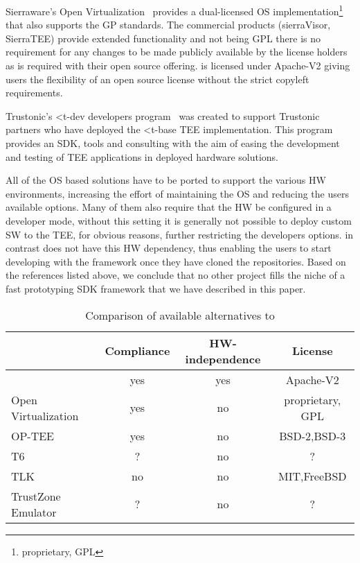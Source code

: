 \documentclass[10pt,conference,letterpaper]{IEEEtran}
\newcommand{\opentee}{\protect{TEE-Vi}\xspace}
\newcommand{\opentee}{\protect{Open-TEE}\xspace}
\begin{document}
Sierraware's Open Virtualization~\cite{web:openVirtua} provides a dual-licensed OS implementation\footnote{proprietary, GPL} that also supports the GP standards. The commercial products (sierraVisor, SierraTEE) provide extended functionality and not being GPL there is no requirement for any changes to be made  publicly available by the license holders as is required with their open source offering. \opentee is licensed under Apache-V2 giving users the flexibility of an open source license without the strict copyleft requirements.

Trustonic's <t-dev developers program~\cite{web:trustonic_t_dev} was created to support Trustonic partners who have deployed the <t-base TEE implementation. This program provides an SDK, tools and consulting with the aim of easing the development and testing of TEE applications in deployed hardware solutions.

All of the OS based solutions have to be ported to support the various HW environments, increasing the effort of maintaining the OS and reducing the users available options.  Many of them also require that the HW be configured in a developer mode, without this setting it is generally not possible to deploy custom SW to the TEE, for obvious reasons, further restricting the developers options.  \opentee in contrast does not have this HW dependency, thus enabling the users to start developing with the framework once they have cloned the repositories. Based on the references listed above, we conclude that no other project fills the niche of a fast prototyping SDK framework that we have described in this paper.

\begin{table}
\centering
\caption{Comparison of available alternatives to \opentee}
\label{tab:alternatives}
\begin{tabular}{l c c c}
  & Compliance & HW-independence & License \\
  \hline
  \opentee & yes & yes & Apache-V2 \\
  \rowcolor{black!15} \cellcolor{black!15}Open Virtualization~\cite{web:openVirtua} & yes & no & proprietary, GPL \\
  OP-TEE~\cite{web:linaro_op_tee}  & yes & no & BSD-2,BSD-3 \\
  \rowcolor{black!15} \cellcolor{black!15}T6~\cite{web:T6} & ? & no & ? \\
  TLK~\cite{web:NVIDIA_TLK} & no & no & MIT,FreeBSD \\
  \rowcolor{black!15} \cellcolor{black!15}TrustZone Emulator~\cite{WinterWPT11} & ? & no & ? \\
\hline
\end{tabular}
\end{table}
 
\end{document}
